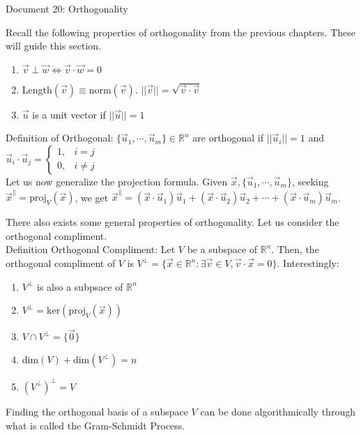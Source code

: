 \documentclass[11pt]{article}
\begin{document}
\begin{center}
Document 20: Orthogonality
\end{center}

Recall the following properties of orthogonality from the previous chapters. These will guide this section.
\begin{enumerate}
\item $\vec{v}\perp \vec{w}\Leftrightarrow \vec{v}\cdot\vec{w}=0$
\item Length$(\vec{v})\equiv \text{norm}(\vec{v})$. $||\vec{v}||=\sqrt{\vec{v}\cdot\vec{v}}$
\item $\vec{u}$ is a unit vector if $||\vec{u}||=1$
\end{enumerate}

\noindent
Definition of Orthogonal: $\lbrace\vec{u}_1,\cdots,\vec{u}_m\rbrace\in\mathbb{R}^n$ are orthogonal if $||\vec{u}_i||=1$ and $\vec{u}_i\cdot\vec{u}_j=\left\lbrace\begin{matrix}1, & i=j\\0, & i\neq j\end{matrix}\right.$\\

Let us now generalize the projection formula. Given $\vec{x},\lbrace\vec{u}_1,\cdots,\vec{u}_m\rbrace$, seeking $\vec{x}^\parallel=\text{proj}_V(\vec{x})$, we get $\vec{x}^\parallel=(\vec{x}\cdot\vec{u}_1)\vec{u}_1+(\vec{x}\cdot\vec{u}_2)\vec{u}_2+\cdots+(\vec{x}\cdot\vec{u}_m)\vec{u}_m$.

There also exists some general properties of orthogonality. Let us consider the orthogonal compliment.\\

\noindent
Definition Orthogonal Compliment: Let $V$ be a subspace of $\mathbb{R}^n$. Then, the orthogonal compliment of $V$ is $V^\perp=\lbrace\vec{x}\in\mathbb{R}^n:\exists\vec{v}\in V,\vec{v}\cdot\vec{x}=0\rbrace$. Interestingly:
\begin{enumerate}
\item $V^\perp$ is also a subpsace of $\mathbb{R}^n$
\item $V^\perp=\text{ker}(\text{proj}_V(\vec{x}))$
\item $V\cap V^\perp =\lbrace\vec{0}\rbrace$
\item dim$(V)+\text{dim}(V^\perp)=n$
\item $(V^\perp)^\perp=V$\\
\end{enumerate}

Finding the orthogonal basis of a subspace $V$ can be done algorithmically through what is called the Gram-Schmidt Process.
\end{document}
